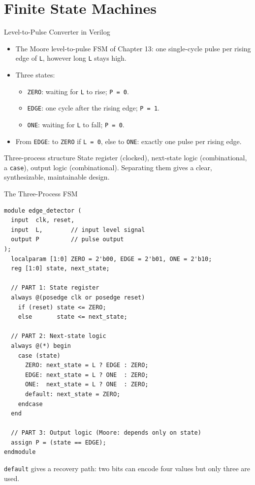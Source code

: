 \documentclass[9pt,aspectratio=169,xcolor=table]{beamer}
\begin{document}
\section{Finite State Machines}

\begin{frame}{Level-to-Pulse Converter in Verilog}
  \begin{itemize}\small\itemsep3pt
    \item The Moore level-to-pulse FSM of Chapter 13: one single-cycle pulse per rising edge of \texttt{L}, however long \texttt{L} stays high.
    \item Three states:
    \begin{itemize}\small
      \item \texttt{ZERO}: waiting for \texttt{L} to rise; \texttt{P = 0}.
      \item \texttt{EDGE}: one cycle after the rising edge; \texttt{P = 1}.
      \item \texttt{ONE}: waiting for \texttt{L} to fall; \texttt{P = 0}.
    \end{itemize}
    \item From \texttt{EDGE}: to \texttt{ZERO} if \texttt{L = 0}, else to \texttt{ONE}: exactly one pulse per rising edge.
  \end{itemize}
  \begin{block}{Three-process structure}
    \small \alert{State register} (clocked), \alert{next-state logic} (combinational, a \texttt{case}), \alert{output logic} (combinational). Separating them gives a clear, synthesizable, maintainable design.
  \end{block}
\end{frame}

\begin{frame}[fragile]{The Three-Process FSM}
\begin{lstlisting}[basicstyle=\ttfamily\scriptsize]
module edge_detector (
  input  clk, reset,
  input  L,        // input level signal
  output P         // pulse output
);
  localparam [1:0] ZERO = 2'b00, EDGE = 2'b01, ONE = 2'b10;
  reg [1:0] state, next_state;

  // PART 1: State register
  always @(posedge clk or posedge reset)
    if (reset) state <= ZERO;
    else       state <= next_state;

  // PART 2: Next-state logic
  always @(*) begin
    case (state)
      ZERO: next_state = L ? EDGE : ZERO;
      EDGE: next_state = L ? ONE  : ZERO;
      ONE:  next_state = L ? ONE  : ZERO;
      default: next_state = ZERO;
    endcase
  end

  // PART 3: Output logic (Moore: depends only on state)
  assign P = (state == EDGE);
endmodule
\end{lstlisting}
  \small \texttt{default} gives a recovery path: two bits can encode four values but only three are used.
\end{frame}
\end{document}
